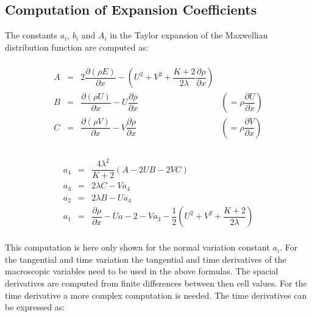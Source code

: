 \documentclass[
	pdftex,             %
	12pt,				%
	a4paper,		   	%
	english,				%
	oneside,			%
]{article}
\begin{document}
\clearpage

\subsection*{Computation of Expansion Coefficients}

The constants $a_i$, $b_i$ and $A_i$ in the Taylor expansion of the Maxwellian distribution function are computed as:

\begin{eqnarray}
\begin{split}
\begin{array}{lcll}
A &=& 2 \dfrac{\partial (\rho E)}{\partial x} 
  - ( U^2 + V^2 + \dfrac{K+2}{2\lambda} \dfrac{\partial\rho}{\partial x} ) &
\\
B &=& \dfrac{\partial (\rho U)}{\partial x} - U\dfrac{\partial \rho}{\partial x}
	&\left( = \rho \dfrac{\partial U}{\partial x} \right)
\\
C &=& \dfrac{\partial (\rho V)}{\partial x} - V\dfrac{\partial \rho}{\partial x}
	&\left( = \rho \dfrac{\partial V}{\partial x} \right)
\end{array}
\end{split}
\end{eqnarray}

\begin{eqnarray}
\begin{split}
\begin{array}{lcl}
a_4 &=& \dfrac{4 \lambda^2}{K+2} ( A - 2 U B - 2 V C )
\\
a_3 &=& 2 \lambda C - V a_4
\\
a_2 &=& 2 \lambda B - U a_4
\\
a_1 &=& \dfrac{\partial \rho}{\partial x} - U a-2 - V a_3 - \dfrac{1}{2} \left( U^2 + V^2 + \dfrac{K+2}{2\lambda} \right)
\end{array}
\end{split}
\end{eqnarray}

This computation is here only shown for the normal variation constant $a_i$. For the tangential and time variation the tangential and time derivatives of the macroscopic variables need to be used in the above formulas. The spacial derivatives are computed from finite differences between then cell values. For the time derivative a more complex computation is needed. The time derivatives can be expressed as:
\end{document}
